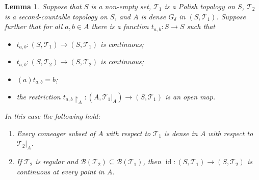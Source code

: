 \documentclass[11pt]{amsart}
\newtheorem{lemma}[theorem]{Lemma}
\theoremstyle{definition}
\newcommand{\Tau}{\mathcal T}
\newcommand{\id}{\operatorname{id}}
\begin{document}
\begin{lemma}\label{lem:bigXX}
    Suppose that \(S\) is a non-empty set, \(\Tau_1\) is a Polish topology on \(S\), \(\Tau_2\) is a second-countable topology on \(S\), and  \(A\) is dense \(G_\delta\) in \((S, \Tau_1)\).
    Suppose further that for all \(a, b\in A\) there is a function \(t_{a, b}:S\to S\) such that
    \begin{itemize}
        \item \(t_{a, b}:(S,\Tau_1)\to (S,\Tau_1)\) is continuous;
        \item \(t_{a, b}:(S,\Tau_2)\to (S,\Tau_2)\) is continuous;
        \item \((a)t_{a,b}=b\);
        \item the restriction \(t_{a, b}{\restriction}_A:(A,\Tau_1|_A)\to (S,\Tau_1)\) is an open map.
    \end{itemize} 
    In this case the following hold:
    \begin{enumerate}
        \item Every comeager subset of \(A\) with respect to \(\Tau_1\) is dense in \(A\) with respect to \(\Tau_2|_A\).
    
        \item If \(\Tau_2\) is regular and \(\mathcal{B}(\Tau_2)\subseteq \mathcal{B}(\Tau_1)\), then \(\id:(S, \Tau_1)\to (S, \Tau_2)\) is continuous at every point in \(A\).
 \end{enumerate}

 
\end{lemma}
\end{document}
